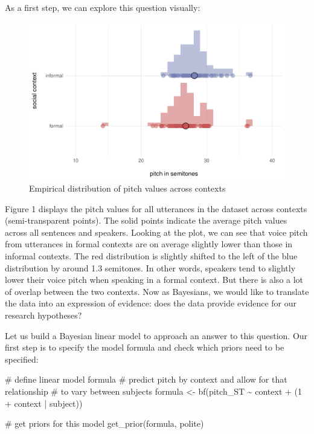 \documentclass[
  doc,
  longtable,
  nolmodern,
  notxfonts,
  notimes,
  colorlinks=true,linkcolor=blue,citecolor=blue,urlcolor=blue]{apa7}
\newenvironment{Shaded}{\begin{snugshade}}{\end{snugshade}}
\newcommand{\CommentTok}[1]{\textcolor[rgb]{0.37,0.37,0.37}{#1}}
\newcommand{\DecValTok}[1]{\textcolor[rgb]{0.68,0.00,0.00}{#1}}
\newcommand{\FunctionTok}[1]{\textcolor[rgb]{0.28,0.35,0.67}{#1}}
\newcommand{\NormalTok}[1]{\textcolor[rgb]{0.00,0.23,0.31}{#1}}
\newcommand{\OtherTok}[1]{\textcolor[rgb]{0.00,0.23,0.31}{#1}}
\newcommand{\SpecialCharTok}[1]{\textcolor[rgb]{0.37,0.37,0.37}{#1}}
\begin{document}
As a first step, we can explore this question visually:

\begin{figure}[H]

\caption{Empirical distribution of pitch values across contexts}

{\centering \includegraphics{manuscript_files/figure-pdf/descriptive-dataviz-1.pdf}

}

\end{figure}%

Figure 1 displays the pitch values for all utterances in the dataset
across contexts (semi-transparent points). The solid points indicate the
average pitch values across all sentences and speakers. Looking at the
plot, we can see that voice pitch from utterances in formal contexts are
on average slightly lower than those in informal contexts. The red
distribution is slightly shifted to the left of the blue distribution by
around 1.3 semitones. In other words, speakers tend to slightly lower
their voice pitch when speaking in a formal context. But there is also a
lot of overlap between the two contexts. Now as Bayesians, we would like
to translate the data into an expression of evidence: does the data
provide evidence for our research hypotheses?

Let us build a Bayesian linear model to approach an answer to this
question. Our first step is to specify the model formula and check which
priors need to be specified:

\begin{Shaded}
\begin{Highlighting}[]
\CommentTok{\# define linear model formula}
\CommentTok{\# predict pitch by context and allow for that relationship }
\CommentTok{\# to vary between subjects}
\NormalTok{formula }\OtherTok{\textless{}{-}} \FunctionTok{bf}\NormalTok{(pitch\_ST }\SpecialCharTok{\textasciitilde{}}\NormalTok{ context }\SpecialCharTok{+}\NormalTok{ (}\DecValTok{1} \SpecialCharTok{+}\NormalTok{ context }\SpecialCharTok{|}\NormalTok{ subject))}

\CommentTok{\# get priors for this model}
\FunctionTok{get\_prior}\NormalTok{(formula, polite)}
\end{Highlighting}
\end{Shaded}
\end{document}
